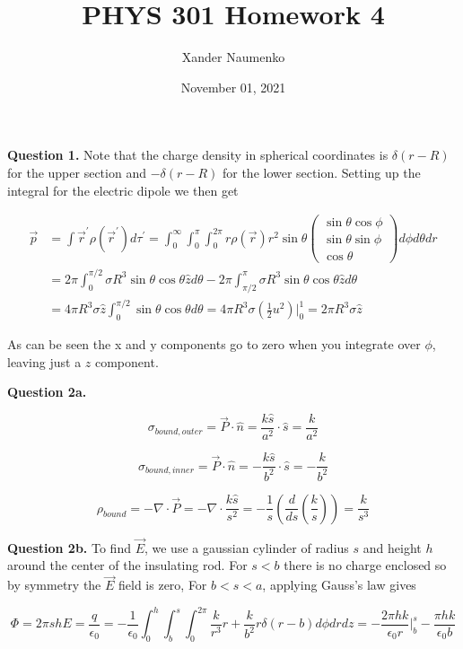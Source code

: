 \documentclass[letterpaper, reqno,11pt]{article}
\begin{document}
\title{PHYS 301 Homework 4}
\date{November 01, 2021}
\author{Xander Naumenko}
\maketitle

{\noindent\bf Question 1.} Note that the charge density in spherical coordinates is $\delta(r-R)$ for the upper section and $-\delta(r-R)$ for the lower section. Setting up the integral for the electric dipole we then get 

\begin{align*}
    \vec p&=\int\vec r^\prime \rho(\vec r^\prime)d\tau^\prime=\int_0^\infty\int_0^{\pi}\int_0^{2\pi}r\rho(\vec r)r^2\sin\theta\begin{pmatrix}\sin\theta\cos\phi\\\sin\theta\sin\phi\\\cos\theta\end{pmatrix} d\phi d\theta dr\\
    &=2\pi\int_0^{\pi/2}\sigma R^3\sin\theta\cos\theta \hat zd\theta-2\pi\int_{\pi/2}^\pi\sigma R^3\sin\theta\cos\theta \hat zd\theta\\
    &=4\pi R^3\sigma\hat z\int_0^{\pi/2}\sin\theta\cos\theta d\theta=4\pi R^3\sigma (\frac12 u^2)\bigg|_{0}^1=2\pi R^3\sigma\hat z
\end{align*}

As can be seen the x and y components go to zero when you integrate over $\phi$, leaving just a $z$ component. 

{\noindent\bf Question 2a.} 

\[
    \sigma_{bound, outer}=\vec P\cdot \hat n =\frac{k\hat s}{a^2}\cdot \hat s=\frac k{a^2}   
\]

\[
    \sigma_{bound, inner}=\vec P\cdot \hat n =-\frac{k\hat s}{b^2}\cdot \hat s=-\frac k{b^2}   
\]

\[
    \rho_{bound}=-\nabla\cdot\vec P=-\nabla\cdot \frac{k\hat s}{s^2}=-\frac1s(\frac{d}{ds}(\frac ks))=\frac k{s^3}
\]

{\noindent\bf Question 2b.} To find $\vec E$, we use a gaussian cylinder of radius $s$ and height $h$ around the center of the insulating rod. For $s<b$ there is no charge enclosed so by symmetry the $\vec E$ field is zero, For $b<s<a$, applying Gauss's law gives 

$$
    \Phi=2\pi sh E=\frac{q}{\epsilon_0}=-\frac{1}{\epsilon_0}\int_0^h\int_b^s\int_0^{2\pi}\frac{k}{r^3}r+\frac{k}{b^2}r\delta(r-b) d\phi drdz=-\frac{2\pi hk}{\epsilon_0r}\bigg|_b^s-\frac{\pi hk}{\epsilon_0 b}
$$
\end{document}
